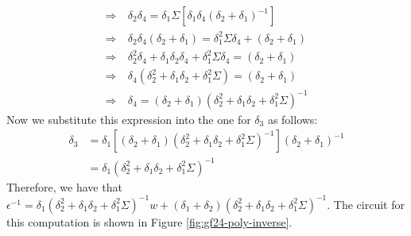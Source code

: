 \begin{align*}
\Rightarrow \: & \delta_2\delta_4 = \delta_1\Sigma[\delta_1\delta_4(\delta_2 + \delta_1)^{-1}] \\
\Rightarrow \: & \delta_2\delta_4(\delta_2 + \delta_1) = \delta_1^2\Sigma\delta_4 + (\delta_2 + \delta_1)\\
\Rightarrow \: & \delta_2^2\delta_4 + \delta_1\delta_2\delta_4 + \delta_1^2\Sigma\delta_4 = (\delta_2 + \delta_1) \\
\Rightarrow \: & \delta_4(\delta_2^2 + \delta_1\delta_2 + \delta_1^2\Sigma) = (\delta_2 + \delta_1) \\
\Rightarrow \: & \delta_4 = (\delta_2 + \delta_1)(\delta_2^2 + \delta_1\delta_2 + \delta_1^2\Sigma)^{-1}
\end{align*}
Now we substitute this expression into the one for $\delta_3$ as follows:
\begin{align*}
\delta_3 & = \delta_1[(\delta_2 + \delta_1)(\delta_2^2 + \delta_1\delta_2 + \delta_1^2\Sigma)^{-1}](\delta_2 + \delta_1)^{-1} \\
& = \delta_1(\delta_2^2 + \delta_1\delta_2 + \delta_1^2\Sigma)^{-1}
\end{align*}
Therefore, we have that $\epsilon^{-1} = \delta_1(\delta_2^2 + \delta_1\delta_2 + \delta_1^2\Sigma)^{-1}w + (\delta_1 + \delta_2)(\delta_2^2 + \delta_1\delta_2 + \delta_1^2\Sigma)^{-1}$. The circuit for this computation is shown in Figure \ref{fig:gf24-poly-inverse}.

